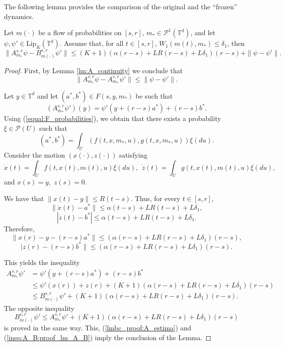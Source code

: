 \documentclass[a4paper,12pt]{article}
\newcommand{\ptd}{\mathcal{P}^1(\mathbb{T}^d)}
\begin{document}
The following lemma provides the comparison of the original and the ``frozen'' dynamics.

\begin{lemma}\label{lm:bellman_close}
	Let $m(\cdot)$ be a flow of probabilities on $[s,r]$, $m_*\in\ptd$, and let $\psi,\psi'\in \mathrm{Lip}_{K}(\mathbb{T}^d)$. Assume that, for all $t\in [s,r]$,  $W_1(m(t),m_*)\leq \delta_1$, then
	$$\|A^{s,r}_{m_*}\psi-B_{m(\cdot)}^{s,r}\psi'\|\leq (K+1)(\alpha(r-s)+LR(r-s)+L\delta_1)(r-s)+\|\psi-\psi'\|. $$
\end{lemma}
\begin{proof}
	First, by Lemma \ref{lm:A_continuity} we conclude that
	\begin{equation}\label{lmbc_proof:A_estima}
	\|A_{m_*}^{s,r}\psi-A_{m_*}^{s,r}\psi'\|\leq\|\psi-\psi'\|.
	\end{equation}
	
	Let $y\in\mathbb{T}^d$ and let $(a^*,b^*)\in F(s,y,m_*)$ be such that
	$$(A^{s,r}_{m_*}\psi')(y)=\psi'(y+(r-s)a^*)+(r-s)b^*. $$
	Using (\ref{equal:F_probabilities}), we obtain that there exists a probability $\xi\in\mathcal{P}(U)$ such that
	$$ (a^*,b^*)=\int_{U}(f(t,x,m_*,u),g(t,x,m_*,u))\xi(du).$$
	Consider the motion $(x(\cdot),z(\cdot))$ satisfying
	$$\dot{x}(t)=\int_U f(t,x(t),m(t),u)\xi(du),\ \ \dot{z}(t)=\int_U g(t,x(t),m(t),u)\xi(du),$$ and $x(s)=y,$ $z(s)=0$.
	
	We have that $\|x(t)-y\|\leq R(t-s)$. Thus, for every $t\in [s,r]$,
	$$\|\dot{x}(t)-a^*\|\leq \alpha(t-s)+LR(t-s)+L\delta_1,$$
	$$ |\dot{z}(t)-b^*|\leq \alpha(t-s)+LR(t-s)+L\delta_1. $$
	Therefore,
	$$\|x(r)-y-(r-s)a^*\|\leq (\alpha(r-s)+LR(r-s)+L\delta_1)(r-s), $$
	$$|z(r)-(r-s)b^*\|\leq (\alpha(r-s)+LR(r-s)+L\delta_1)(r-s). $$
	
	This yields the inequality
	\begin{equation}\label{ineq:A_B:proof_lm_A_B}
	\begin{split}
	A^{s,r}_{m_*}\psi'&=\psi'(y+(r-s)a^*)+(r-s)b^* \\
	&\leq \psi'(x(r))+z(r)+(K+1)(\alpha(r-s)+LR(r-s)+L\delta_1)(r-s)\\
	&\leq B^{s,r}_{m(\cdot)}\psi'+(K+1)(\alpha(r-s)+LR(r-s)+L\delta_1)(r-s).
	\end{split}
	\end{equation}
	The opposite inequality
	$$B^{s,r}_{m(\cdot)}\psi'\leq A^{s,r}_{m_*}\psi'+(K+1)(\alpha(r-s)+LR(r-s)+L\delta_1)(r-s) $$ is proved in the same way. This, (\ref{lmbc_proof:A_estima}) and (\ref{ineq:A_B:proof_lm_A_B}) imply the conclusion of the Lemma.
\end{proof}
\end{document}
